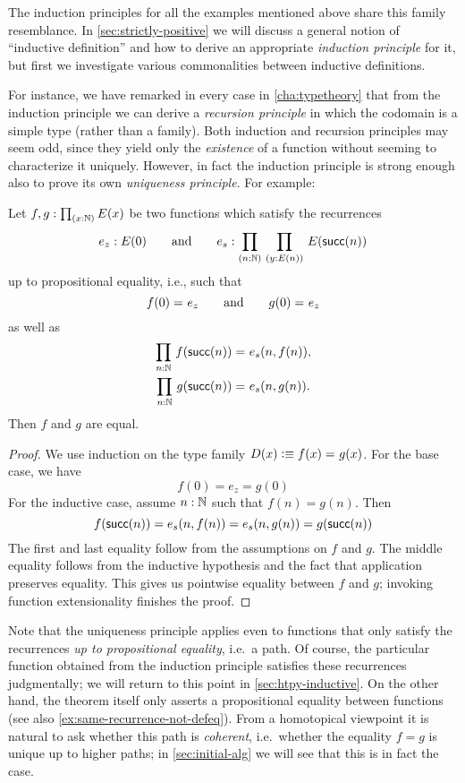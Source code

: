 The induction principles for all the examples mentioned above share this family resemblance.
In \autoref{sec:strictly-positive} we will discuss a general notion of ``inductive definition'' and how to derive an appropriate \emph{induction principle} for it, but first we investigate various commonalities between inductive definitions.

For instance, we have remarked in every case in \autoref{cha:typetheory} that from the induction principle we can derive a \emph{recursion principle} in which the codomain is a simple type (rather than a family).
Both induction and recursion principles may seem odd, since they yield only the \emph{existence} of a function without seeming to characterize it uniquely.
However, in fact the induction principle is strong enough also to prove its own \emph{uniqueness principle}.
%
For example:

\begin{thm}\label{thm:nat-uniq}
Let $f,g : \prd{x:\nat} E(x)$ be two functions which satisfy the recurrences 
%
\begin{equation*}
  e_z : E(0)
  \qquad\text{and}\qquad
  e_s : \prd{n : \nat}{y : E(n)} E(\suc(n))
\end{equation*}
%
up to propositional equality, i.e., such that
\begin{equation*}
  f(0) =_{} e_z
  \qquad\text{and}\qquad
  g(0) =_{} e_z
\end{equation*}
as well as
\begin{gather*}
  \prd{n : \nat} \id{f(\suc(n))}{e_s(n, f(n))},\\
  \prd{n : \nat} \id{g(\suc(n))}{e_s(n, g(n))}.
\end{gather*}
Then $f$ and $g$ are equal.
\end{thm}

\begin{proof}
We use induction on the type family $D(x) \vcentcolon\equiv f(x) =_{} g(x)$. For the base case, we have \[f(0) = e_z = g(0)\]
For the inductive case, assume $n : \mathbb{N}$ such that $f(n) = g(n)$. Then
\[ f(\mathsf{succ}(n)) = e_s(n, f(n)) = e_s(n, g(n)) = g(\mathsf{succ}(n)) \]
The first and last equality follow from the assumptions on $f$ and $g$. The middle equality follows from the inductive hypothesis and the fact that application preserves equality. This gives us pointwise equality between $f$ and $g$; invoking function extensionality finishes the proof.
\end{proof}

Note that the uniqueness principle applies even to functions that only satisfy the recurrences \emph{up to propositional equality}, i.e.\ a path.
Of course, the particular function obtained from the induction principle satisfies these recurrences judgmentally; we will return to this point in \autoref{sec:htpy-inductive}.
On the other hand, the theorem itself only asserts a propositional equality between functions (see also \autoref{ex:same-recurrence-not-defeq}).
From a homotopical viewpoint it is natural to ask whether this path is \emph{coherent}, i.e.\ whether the equality $f=g$ is unique up to higher paths; in \autoref{sec:initial-alg} we will see that this is in fact the case.


